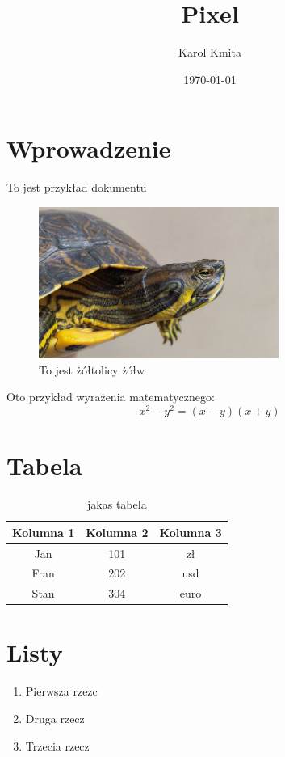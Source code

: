 \documentclass{article}
\title{Pixel}
\author{Karol Kmita}
\date{\today}
\begin{document}
\maketitle


\section{Wprowadzenie}
To jest przykład dokumentu 

\begin{figure}[h]
    \centering
    \includegraphics[width=0.7\textwidth]{pictures/zolw.jpg}
    \caption{To jest żółtolicy żółw}
    \label{fig:zolwik}
\end{figure}

Oto przykład wyrażenia matematycznego:
\begin{equation}
    x^2-y^2=(x-y)(x+y)
\end{equation}

\section{Tabela}\label{sec:tabela}

\begin{table}[h]
    \centering
    \begin{tabular}{|c|c|c|}
        \hline
        Kolumna 1 & Kolumna 2 & Kolumna 3  \\
        \hline
         Jan & 101 & zł \\
         Fran & 202 & usd \\
         Stan & 304 & euro\\
        \hline
    \end{tabular}
    \caption{jakas tabela}
\end{table}


\section{Listy}\label{sec:listy}
\begin{enumerate}
    \item Pierwsza rzezc
    \item Druga rzecz
    \item Trzecia rzecz
\end{enumerate}
\end{document}
